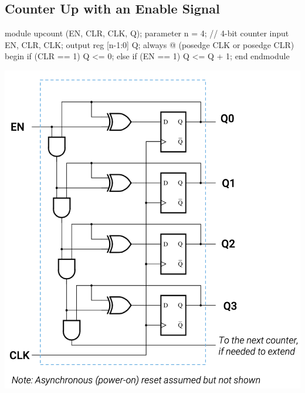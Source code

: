 \documentclass[12pt,openany]{book}
\begin{document}
\subsection{Counter Up with an Enable Signal}
\begin{minipage}[htp]{0.4\textwidth}
	\begin{vhdl}
module upcount (EN, CLR, CLK, Q);
parameter n = 4; // 4-bit counter
input EN, CLR, CLK;
output reg [n-1:0] Q;
	always @ (posedge CLK or posedge CLR)
	begin
		if (CLR == 1) Q <= 0;
		else if (EN == 1) Q <= Q + 1;
	end
endmodule
	\end{vhdl}
\end{minipage}
\hfill
\vline
\hfill
\begin{minipage}[htp]{0.4\textwidth}
\includegraphics[width=1.3\textwidth]{circuits/14.5.png}
\end{minipage}
\end{document}
